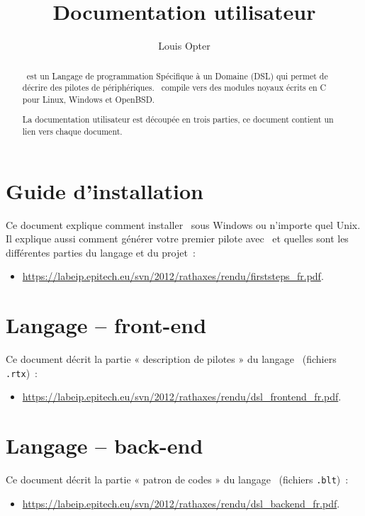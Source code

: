 \documentclass[francais]{rtxarticle}
\title{Documentation utilisateur}
\author{Louis Opter}
\begin{document}
\maketitle

\begin{abstract}
\rtx\ est un Langage de programmation Spécifique à un Domaine (DSL) qui permet
de décrire des pilotes de périphériques. \rtx\ compile vers des modules noyaux
écrits en C pour Linux, Windows et OpenBSD.

La documentation utilisateur est découpée en trois parties, ce document contient
un lien vers chaque document.
\end{abstract}

\section{Guide d'installation}

Ce document explique comment installer \rtx\ sous Windows ou n'importe quel
Unix. Il explique aussi comment générer votre premier pilote avec \rtx\ et
quelles sont les différentes parties du langage et du projet~:
\begin{itemize}
\item {\small\url{https://labeip.epitech.eu/svn/2012/rathaxes/rendu/firststeps_fr.pdf}}.
\end{itemize}

\section{Langage -- front-end}

Ce document décrit la partie « description de pilotes » du langage \rtx\
(fichiers \texttt{.rtx})~:
\begin{itemize}
\item {\small\url{https://labeip.epitech.eu/svn/2012/rathaxes/rendu/dsl_frontend_fr.pdf}}.
\end{itemize}

\section{Langage -- back-end}

Ce document décrit la partie « patron de codes » du langage \rtx\ (fichiers
\texttt{.blt})~:
\begin{itemize}
\item {\small\url{https://labeip.epitech.eu/svn/2012/rathaxes/rendu/dsl_backend_fr.pdf}}.
\end{itemize}
\end{document}
